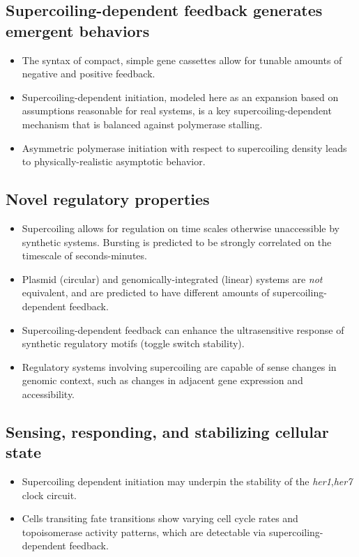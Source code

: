 \documentclass[11pt]{article}
\begin{document}
\subsection{Supercoiling-dependent feedback generates emergent behaviors}
\begin{itemize}
    \item The syntax of compact, simple gene cassettes allow for tunable amounts of negative and positive feedback.
    \item Supercoiling-dependent initiation, modeled here as an expansion based on assumptions reasonable for real systems, is a key supercoiling-dependent mechanism that is balanced against polymerase stalling.
    \item Asymmetric polymerase initiation with respect to supercoiling density leads to physically-realistic asymptotic behavior.
\end{itemize}

\subsection{Novel regulatory properties}
\begin{itemize}
    \item Supercoiling allows for regulation on time scales otherwise unaccessible by synthetic systems. Bursting is predicted to be strongly correlated on the timescale of seconds-minutes.
    \item Plasmid (circular) and genomically-integrated (linear) systems are \emph{not} equivalent, and are predicted to have different amounts of supercoiling-dependent feedback.
    \item Supercoiling-dependent feedback can enhance the ultrasensitive response of synthetic regulatory motifs (toggle switch stability). 
    \item Regulatory systems involving supercoiling are capable of sense changes in genomic context, such as changes in adjacent gene expression and accessibility.
\end{itemize}

\subsection{Sensing, responding, and stabilizing cellular state}
\begin{itemize}
    \item Supercoiling dependent initiation may underpin the stability of the \textit{her1},\textit{her7} clock circuit.
    \item Cells transiting fate transitions show varying cell cycle rates and topoisomerase activity patterns, which are detectable via supercoiling-dependent feedback.
\end{itemize}
\end{document}
